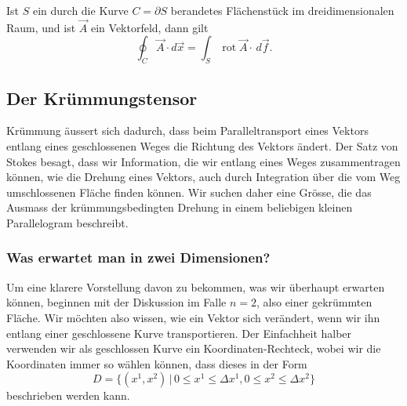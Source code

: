 \begin{satz}[Stokes]
Ist $S$ ein durch die Kurve $C=\partial S$ berandetes Flächenstück
im dreidimensionalen Raum, und ist $\vec A$ ein Vektorfeld, dann gilt
\[
\oint_C \vec A\cdot d\vec{x} = \int_S\operatorname{rot}\vec A\cdot \,d\vec f.
\]
\end{satz}

\subsection{Der Krümmungstensor%
\label{skript:kruemmung:section:kruemmungstensor}}
Krümmung äussert sich dadurch, dass beim Paralleltransport eines Vektors
entlang eines geschlossenen Weges die Richtung des Vektors ändert.
Der Satz von Stokes besagt, dass wir Information, die wir entlang eines
Weges zusammentragen können, wie die Drehung eines Vektors, auch durch
Integration über die vom Weg umschlossenen Fläche finden können.
Wir suchen daher eine Grösse, die das Ausmass der krümmungsbedingten
Drehung in einem beliebigen kleinen Parallelogram beschreibt.

\subsubsection{Was erwartet man in zwei Dimensionen?}
Um eine klarere Vorstellung davon zu bekommen, was wir überhaupt erwarten
können, beginnen mit der Diskussion im Falle $n=2$, also einer gekrümmten
Fläche.
Wir möchten also wissen, wie ein Vektor sich verändert, wenn wir ihn
entlang einer geschlossene Kurve transportieren.
Der Einfachheit halber verwenden wir als geschlossen Kurve
ein Koordinaten-Rechteck, wobei wir die Koordinaten immer so wählen
können, dass dieses in der Form
\[
D=\{ (x^1,x^2)\,|\,
0\le x^1 \le \Delta x^1, 
0\le x^2 \le \Delta x^2 \}
\]
beschrieben werden kann.

